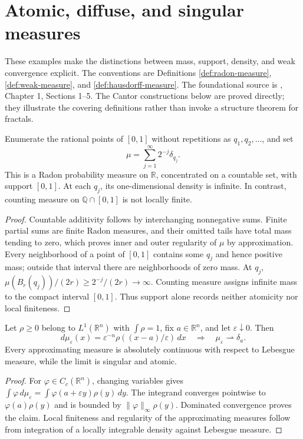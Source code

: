 \chapter{Atomic, diffuse, and singular measures}\label{sec:examples-measures}
These examples make the distinctions between mass, support, density, and weak convergence explicit. The conventions are Definitions \ref{def:radon-measure}, \ref{def:weak-measure}, and \ref{def:hausdorff-measure}. The foundational source is \cite{Sim18}, Chapter 1, Sections 1--5. The Cantor constructions below are proved directly; they illustrate the covering definitions rather than invoke a structure theorem for fractals.

\begin{example}\label{ex:dense-atomic-measure}
Enumerate the rational points of $[0,1]$ without repetitions as $q_1,q_2,\ldots$, and set
\[
 \mu=\sum_{j=1}^{\infty}2^{-j}\delta_{q_j}.
\]
This is a Radon probability measure on $\mathbb R$, concentrated on a countable set, with support $[0,1]$. At each $q_j$, its one-dimensional density is infinite. In contrast, counting measure on $\mathbb Q\cap[0,1]$ is not locally finite.
\end{example}
\begin{proof}
Countable additivity follows by interchanging nonnegative sums. Finite partial sums are finite Radon measures, and their omitted tails have total mass tending to zero, which proves inner and outer regularity of $\mu$ by approximation. Every neighborhood of a point of $[0,1]$ contains some $q_j$ and hence positive mass; outside that interval there are neighborhoods of zero mass. At $q_j$, $\mu(B_r(q_j))/(2r)\geq2^{-j}/(2r)\to\infty$. Counting measure assigns infinite mass to the compact interval $[0,1]$. Thus support alone records neither atomicity nor local finiteness.
\end{proof}

\begin{example}\label{ex:approximate-identity-dirac}
Let $\rho\geq0$ belong to $L^1(\mathbb R^n)$ with $\int\rho=1$, fix $a\in\mathbb R^n$, and let $\varepsilon\downarrow0$. Then
\[
 d\mu_\varepsilon(x)=\varepsilon^{-n}\rho((x-a)/\varepsilon)\,dx
 \quad\Longrightarrow\quad \mu_\varepsilon\rightharpoonup\delta_a.
\]
Every approximating measure is absolutely continuous with respect to Lebesgue measure, while the limit is singular and atomic.
\end{example}
\begin{proof}
For $\varphi\in C_c(\mathbb R^n)$, changing variables gives $\int\varphi\,d\mu_\varepsilon=\int\varphi(a+\varepsilon y)\rho(y)\,dy$. The integrand converges pointwise to $\varphi(a)\rho(y)$ and is bounded by $\|\varphi\|_\infty\rho(y)$. Dominated convergence proves the claim. Local finiteness and regularity of the approximating measures follow from integration of a locally integrable density against Lebesgue measure.
\end{proof}

